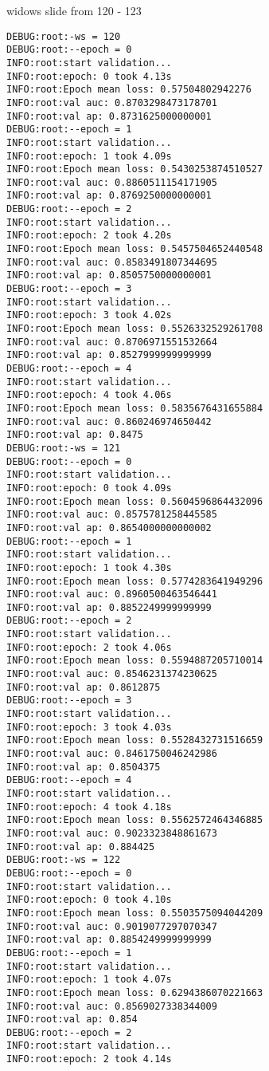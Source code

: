 \documentclass[11pt]{article}
\begin{document}
widows slide from 120 - 123
\begin{verbatim}
DEBUG:root:-ws = 120
DEBUG:root:--epoch = 0
INFO:root:start validation...
INFO:root:epoch: 0 took 4.13s
INFO:root:Epoch mean loss: 0.57504802942276
INFO:root:val auc: 0.8703298473178701
INFO:root:val ap: 0.8731625000000001
DEBUG:root:--epoch = 1
INFO:root:start validation...
INFO:root:epoch: 1 took 4.09s
INFO:root:Epoch mean loss: 0.5430253874510527
INFO:root:val auc: 0.8860511154171905
INFO:root:val ap: 0.8769250000000001
DEBUG:root:--epoch = 2
INFO:root:start validation...
INFO:root:epoch: 2 took 4.20s
INFO:root:Epoch mean loss: 0.5457504652440548
INFO:root:val auc: 0.8583491807344695
INFO:root:val ap: 0.8505750000000001
DEBUG:root:--epoch = 3
INFO:root:start validation...
INFO:root:epoch: 3 took 4.02s
INFO:root:Epoch mean loss: 0.5526332529261708
INFO:root:val auc: 0.8706971551532664
INFO:root:val ap: 0.8527999999999999
DEBUG:root:--epoch = 4
INFO:root:start validation...
INFO:root:epoch: 4 took 4.06s
INFO:root:Epoch mean loss: 0.5835676431655884
INFO:root:val auc: 0.860246974650442
INFO:root:val ap: 0.8475
DEBUG:root:-ws = 121
DEBUG:root:--epoch = 0
INFO:root:start validation...
INFO:root:epoch: 0 took 4.09s
INFO:root:Epoch mean loss: 0.5604596864432096
INFO:root:val auc: 0.8575781258445585
INFO:root:val ap: 0.8654000000000002
DEBUG:root:--epoch = 1
INFO:root:start validation...
INFO:root:epoch: 1 took 4.30s
INFO:root:Epoch mean loss: 0.5774283641949296
INFO:root:val auc: 0.8960500463546441
INFO:root:val ap: 0.8852249999999999
DEBUG:root:--epoch = 2
INFO:root:start validation...
INFO:root:epoch: 2 took 4.06s
INFO:root:Epoch mean loss: 0.5594887205710014
INFO:root:val auc: 0.8546231374230625
INFO:root:val ap: 0.8612875
DEBUG:root:--epoch = 3
INFO:root:start validation...
INFO:root:epoch: 3 took 4.03s
INFO:root:Epoch mean loss: 0.5528432731516659
INFO:root:val auc: 0.8461750046242986
INFO:root:val ap: 0.8504375
DEBUG:root:--epoch = 4
INFO:root:start validation...
INFO:root:epoch: 4 took 4.18s
INFO:root:Epoch mean loss: 0.5562572464346885
INFO:root:val auc: 0.9023323848861673
INFO:root:val ap: 0.884425
DEBUG:root:-ws = 122
DEBUG:root:--epoch = 0
INFO:root:start validation...
INFO:root:epoch: 0 took 4.10s
INFO:root:Epoch mean loss: 0.5503575094044209
INFO:root:val auc: 0.9019077297070347
INFO:root:val ap: 0.8854249999999999
DEBUG:root:--epoch = 1
INFO:root:start validation...
INFO:root:epoch: 1 took 4.07s
INFO:root:Epoch mean loss: 0.6294386070221663
INFO:root:val auc: 0.8569027338344009
INFO:root:val ap: 0.854
DEBUG:root:--epoch = 2
INFO:root:start validation...
INFO:root:epoch: 2 took 4.14s

\end{verbatim}
\end{document}
